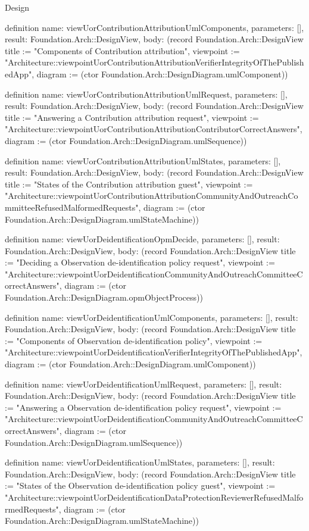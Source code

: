 \begin{lexlean}{Design}
\begin{semanticmodule}
definition{
  name: viewUorContributionAttributionUmlComponents,
  parameters: [],
  result: Foundation.Arch::DesignView,
  body: (record Foundation.Arch::DesignView {title := "Components of Contribution attribution", viewpoint := "Architecture::viewpointUorContributionAttributionVerifierIntegrityOfThePublishedApp", diagram := (ctor Foundation.Arch::DesignDiagram.umlComponent)})
}

definition{
  name: viewUorContributionAttributionUmlRequest,
  parameters: [],
  result: Foundation.Arch::DesignView,
  body: (record Foundation.Arch::DesignView {title := "Answering a Contribution attribution request", viewpoint := "Architecture::viewpointUorContributionAttributionContributorCorrectAnswers", diagram := (ctor Foundation.Arch::DesignDiagram.umlSequence)})
}

definition{
  name: viewUorContributionAttributionUmlStates,
  parameters: [],
  result: Foundation.Arch::DesignView,
  body: (record Foundation.Arch::DesignView {title := "States of the Contribution attribution guest", viewpoint := "Architecture::viewpointUorContributionAttributionCommunityAndOutreachCommitteeRefusedMalformedRequests", diagram := (ctor Foundation.Arch::DesignDiagram.umlStateMachine)})
}

definition{
  name: viewUorDeidentificationOpmDecide,
  parameters: [],
  result: Foundation.Arch::DesignView,
  body: (record Foundation.Arch::DesignView {title := "Deciding a Observation de-identification policy request", viewpoint := "Architecture::viewpointUorDeidentificationCommunityAndOutreachCommitteeCorrectAnswers", diagram := (ctor Foundation.Arch::DesignDiagram.opmObjectProcess)})
}

definition{
  name: viewUorDeidentificationUmlComponents,
  parameters: [],
  result: Foundation.Arch::DesignView,
  body: (record Foundation.Arch::DesignView {title := "Components of Observation de-identification policy", viewpoint := "Architecture::viewpointUorDeidentificationVerifierIntegrityOfThePublishedApp", diagram := (ctor Foundation.Arch::DesignDiagram.umlComponent)})
}

definition{
  name: viewUorDeidentificationUmlRequest,
  parameters: [],
  result: Foundation.Arch::DesignView,
  body: (record Foundation.Arch::DesignView {title := "Answering a Observation de-identification policy request", viewpoint := "Architecture::viewpointUorDeidentificationCommunityAndOutreachCommitteeCorrectAnswers", diagram := (ctor Foundation.Arch::DesignDiagram.umlSequence)})
}

definition{
  name: viewUorDeidentificationUmlStates,
  parameters: [],
  result: Foundation.Arch::DesignView,
  body: (record Foundation.Arch::DesignView {title := "States of the Observation de-identification policy guest", viewpoint := "Architecture::viewpointUorDeidentificationDataProtectionReviewerRefusedMalformedRequests", diagram := (ctor Foundation.Arch::DesignDiagram.umlStateMachine)})
}


\end{semanticmodule}
\end{lexlean}
